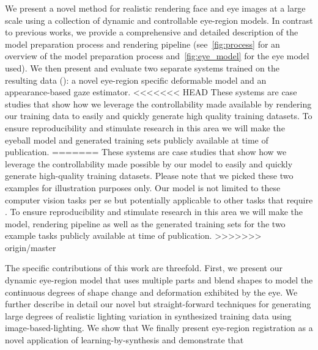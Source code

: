 


We present a novel method for realistic rendering face and eye images at a large scale using a collection of dynamic and controllable eye-region models.
In contrast to previous works, we provide a comprehensive and detailed description of the model preparation process and rendering pipeline (see~\autoref{fig:process} for an overview of the model preparation process and~\autoref{fig:eye_model} for the eye model used).
We then present and evaluate two separate systems trained on the resulting data (\emph{\dataset}): a novel eye-region specific deformable model and an appearance-based gaze estimator.
<<<<<<< HEAD
These systems are case studies that show how we leverage the controllability made available by rendering our training data to easily and quickly generate high quality training datasets.
To ensure reproducibility and stimulate research in this area we will make the eyeball model and generated training sets publicly available at time of publication.
=======
These systems are case studies that show how we leverage the controllability made possible by our model to easily and quickly generate high-quality training datasets.
Please note that we picked these two examples for illustration purposes only.
Our model is not limited to these computer vision tasks per se but potentially applicable to other tasks that require .
To ensure reproducibility and stimulate research in this area we will make the model, rendering pipeline as well as the generated training sets for the two example tasks publicly available at time of publication.
>>>>>>> origin/master

The specific contributions of this work are threefold.
First, we present our dynamic eye-region model that uses multiple parts and blend shapes to model the continuous degrees of shape change and deformation exhibited by the eye.
We further describe in detail our novel but straight-forward techniques for generating large degrees of realistic lighting variation in synthesized training data using image-based-lighting.
We show that 
We finally present eye-region registration as a novel application of learning-by-synthesis and demonstrate that 